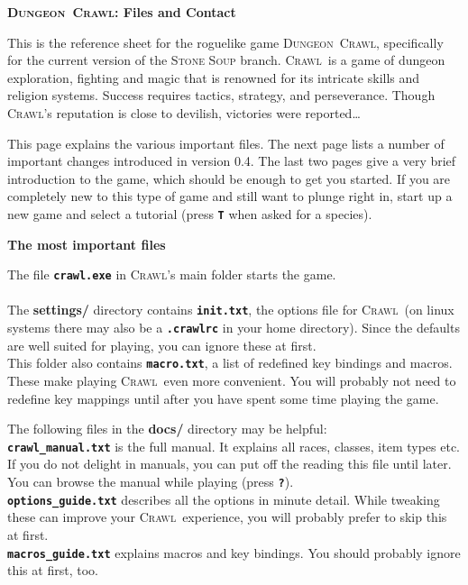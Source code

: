 \documentclass[a4paper,10pt]{article}
\newcommand{\key}[1]{{{\texttt{\textbf{#1}}}}} %
\newcommand{\sex}[1]{{{\textbf{#1}}}} %
\newcommand{\crawl}{\textsc{Crawl}}
\newcommand{\dungeon}{\textsc{Dungeon}}
\newcommand{\spacecolumn}{\begin{minipage}[t]{2cm}\phantom{xxxx}\end{minipage}}
\newcommand{\para}{\vspace{1.5ex}}
\begin{document}
\begin{center}\textbf{\LARGE
\dungeon\ \crawl: Files and Contact
}\end{center}

This is the reference sheet for the roguelike game \dungeon\ \crawl,
specifically for the current version of the \textsc{Stone Soup} branch. 
\crawl\ is a game of dungeon exploration, fighting and magic that is
renowned for its intricate skills and religion systems. Success requires
tactics, strategy, and perseverance. Though \crawl's reputation is 
close to devilish, victories were reported\dots

\para

This page explains the various important files. The next page lists a 
number of important changes introduced in version 0.4. The last two 
pages give a very brief introduction to the game, which should be 
enough to get you started. If you are completely new to this type of 
game and still want to plunge right in, start up a new game and select 
a tutorial (press \key{T} when asked for a species).

\para\para

\sex{The most important files}

\para

\begin{minipage}[t]{7cm}
The file \key{crawl.exe} in \crawl's main folder starts the game.
\\ \\
The \sex{settings/} directory contains \key{init.txt}, the options file for
\crawl\ (on linux systems there may also be a \key{.crawlrc} in your home
directory). Since the defaults are well suited for playing, you can ignore
these at first.
\\
This folder also contains \key{macro.txt}, a list of redefined key 
bindings and macros. These make playing \crawl\ even more convenient. 
You will probably not need to redefine key mappings until after you have
spent some time playing the game.
\end{minipage}
%
\spacecolumn
%
\begin{minipage}[t]{7cm}
The following files in the \sex{docs/} directory may be helpful:
\\
\key{crawl\_manual.txt} is the full manual. It explains all races, classes, 
item types etc. If you do not delight in manuals, you can put off the 
reading this file until later. You can browse the manual while playing 
(press \key{?}).
\\
\key{options\_guide.txt} describes all the options in minute detail. While
tweaking these can improve your \crawl\ experience, you will probably prefer
to skip this at first.
\\
\key{macros\_guide.txt} explains macros and key bindings. You should probably
ignore this at first, too.
\end{minipage}
\end{document}
